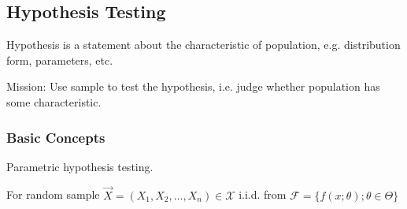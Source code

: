 \subsection{Hypothesis Testing}\label{SectionHypothesisTesting}
    Hypothesis is a statement about the characteristic of population, e.g. distribution form, parameters, etc. 
    
    Mission: Use sample to test the hypothesis, i.e. judge whether population has some characteristic.

\subsubsection{Basic Concepts}\label{SubSectionHypothesisTestingBasicConcepts}
    Parametric hypothesis testing.

    For random sample $\vec{X}=(X_1,X_2,\ldots,X_n)\in\mathscr{X}$ i.i.d. from $\mathscr{F}=\{f(x;\theta);\theta\in\Theta\}$
